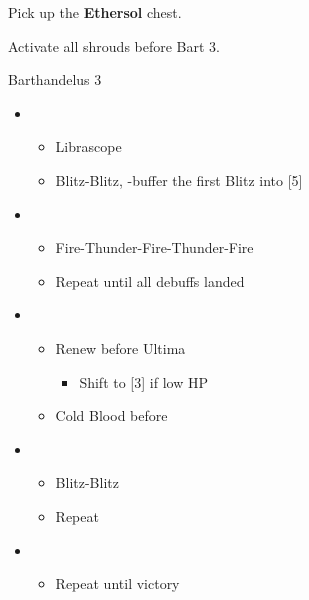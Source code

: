 Pick up the \textbf{Ethersol} chest.
\vfill
\ 
\columnbreak

Activate all shrouds before Bart 3.

\begin{battle}{Barthandelus 3}
	\begin{itemize}
		\item \second
			\begin{itemize}
				\item Librascope
				\item Blitz-Blitz, \rav-buffer the first Blitz into [5]
			\end{itemize}
		\item \fifth
			\begin{itemize}
				\item Fire-Thunder-Fire-Thunder-Fire
				\item Repeat until all debuffs landed
			\end{itemize}
		\item \sixth
			\begin{itemize}
				\item Renew before Ultima
					\begin{itemize}
						\item Shift to [3] if low HP
					\end{itemize}
				\item Cold Blood before \stagger
			\end{itemize}
		\item \second
			\begin{itemize}
				\item Blitz-Blitz
				\item Repeat
			\end{itemize}
		\item \first
			\begin{itemize}
				\item Repeat until victory
			\end{itemize}
	\end{itemize}
\end{battle}


